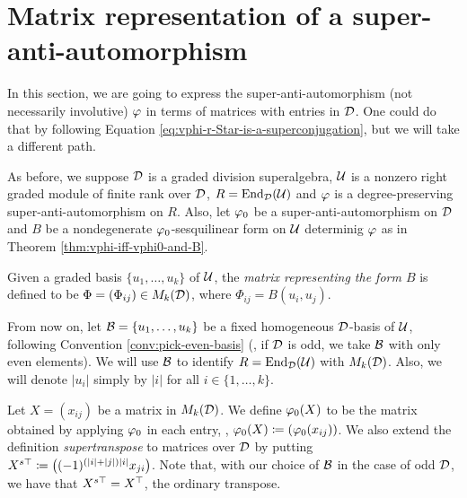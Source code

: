 \section{Matrix representation of a su\-per\--anti\--auto\-mor\-phism}\label{sec:matrix-super-anti-auto}

In this section, we are going to express the super-anti-automorphism (not necessarily involutive) $\varphi$ in terms of matrices with entries in $\mathcal{D}$.
One could do that by following Equation \eqref{eq:vphi-r-Star-is-a-superconjugation}, but we will take a different path.

As before, we suppose $\mathcal{D}$ is a graded division superalgebra, $\mathcal U$ is a nonzero right graded module of finite rank over $\mathcal{D}$, $R = \operatorname{End}_{\mathcal{D}} (\mathcal U)$ and $\varphi$ is a degree-preserving super-anti-automorphism on $R$.
Also, let $\varphi_0$ be a super-anti-automorphism on $\mathcal{D}$ and $B$ be a nondegenerate $\varphi_0$-sesquilinear form on $\mathcal U$ determinig $\varphi$ as in Theorem \ref{thm:vphi-iff-vphi0-and-B}.

\begin{defi}\label{def:matrix-representing-B}
	Given a graded basis $\{u_1, \ldots, u_k\}$ of $\mathcal U$, the \emph{matrix representing the form $B$} is defined to be $\Phi = (\Phi_{ij}) \in M_k(\mathcal{D})$, where $\Phi_{ij} = B(u_i, u_j)$.
\end{defi}

From now on, let $\mathcal B = \{u_1, \ldots, u_k\}$ be a fixed homogeneous $\mathcal{D}$-basis of $\mathcal U$, following Convention \ref{conv:pick-even-basis} (\ie, if $\mathcal{D}$ is odd, we take $\mathcal B$ with only even elements).
We will use $\mathcal B$ to identify $R = \operatorname{End}_{\mathcal{D}} (\mathcal U)$ with $M_k (\mathcal{D})$.
Also, we will denote $|u_i|$ simply by $|i|$ for all $i \in \{1, \ldots, k\}$.




\begin{defi}
	Let $X = (x_{ij})$ be a matrix in $M_k (\mathcal{D})$.
	We define $\varphi_0 (X)$ to be the matrix obtained by applying $\varphi_0$ in each entry, \ie, $\varphi_0 (X) \coloneqq (\varphi_0(x_{ij}))$.
	We also extend the definition \emph{supertranspose}  to matrices over $\mathcal{D}$ by putting $X^{s\top} \coloneqq \big((-1)^{(|i| + |j|) |i|} x_{ji} \big)$.
	Note that, with our choice of $\mathcal B$ in the case of odd $\mathcal{D}$, we have that $X^{s\top} = X^{\top}$, the ordinary transpose.
\end{defi}

